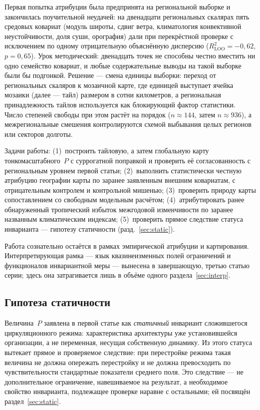 \documentclass[11pt,a4paper]{article}
\begin{document}
Первая попытка атрибуции была предпринята на региональной выборке и закончилась поучительной неудачей: на двенадцати региональных скалярах пять средовых ковариат (модуль широты, сдвиг ветра, климатология конвективной неустойчивости, доля суши, орография) дали при перекрёстной проверке с исключением по одному отрицательную объяснённую дисперсию ($R^2_{\mathrm{LOO}}=-0{,}62$, $p=0{,}65$). Урок методический: двенадцать точек не способны честно вместить ни одно семейство ковариат, и любые содержательные выводы на такой выборке были бы подгонкой. Решение --- смена единицы выборки: переход от региональных скаляров к мозаичной карте, где единицей выступает ячейка мозаики (далее --- тайл) размером в сотни километров, а региональная принадлежность тайлов используется как блокирующий фактор статистики. Число степеней свободы при этом растёт на порядок ($n\approx144$, затем $n\approx936$), а межрегиональные смешения контролируются схемой выбывания целых регионов или секторов долготы.

Задачи работы: (1)~построить тайловую, а затем глобальную карту тонкомасштабного~$P$ с суррогатной поправкой и проверить её согласованность с региональным уровнем первой статьи; (2)~выполнить статистически честную атрибуцию географии карты по заранее заявленным внешним ковариатам, с отрицательным контролем и контрольной мишенью; (3)~проверить природу карты сопоставлением со свободным модельным расчётом; (4)~атрибутировать ранее обнаруженный тропический избыток межгодовой изменчивости по заранее названным климатическим индексам; (5)~проверить прямое следствие статуса инварианта --- гипотезу статичности (разд.~\ref{sec:static}).

Работа сознательно остаётся в рамках эмпирической атрибуции и картирования. Интерпретирующая рамка --- язык квазинеизменных полей ограничений и функционалов инвариантной меры --- вынесена в завершающую, третью статью серии; здесь она затрагивается лишь в объёме одного раздела~\ref{sec:interp}.

\subsection{Гипотеза статичности}

Величина~$P$ заявлена в первой статье как \emph{статичный} инвариант сложившегося циркуляционного режима: характеристика архитектуры уже установившейся организации, а не переменная, несущая собственную динамику. Из этого статуса вытекает прямое и проверяемое следствие: при перестройке режима такая величина не должна опережать перестройку и не должна превосходить по чувствительности стандартные показатели среднего поля. Это следствие --- не дополнительное ограничение, навешиваемое на результат, а необходимое свойство инварианта, подлежащее проверке наравне с остальными; ей посвящён раздел~\ref{sec:static}.
\end{document}
